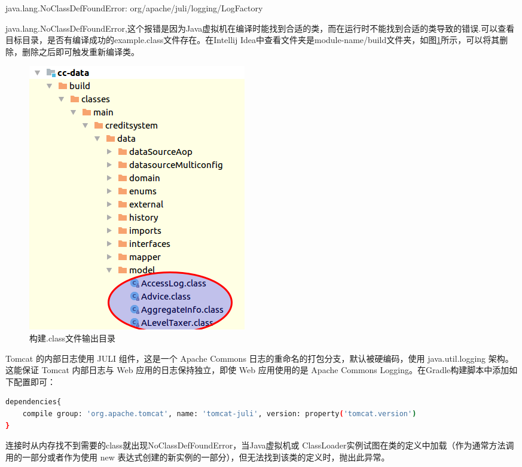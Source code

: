 \documentclass[12pt]{book}
\makeatletter
\numberwithin{dummy}{section}
\theoremstyle{ocrenumbox}
\theoremstyle{blacknumex}
\theoremstyle{blacknumbox}
\theoremstyle{ocrenum}
\renewcommand\paragraph{\@startsection{paragraph}{4}{\z@}
	{-2ex \@plus-.2ex \@minus .2ex}
	{.1ex}
	{\normalfont\small\sffamily\bfseries}}
\makeatother
\begin{document}
\paragraph{java.lang.NoClassDefFoundError: org/apache/juli/logging/LogFactory}

java.lang.NoClassDefFoundError,这个报错是因为Java虚拟机在编译时能找到合适的类，而在运行时不能找到合适的类导致的错误.可以查看目标目录，是否有编译成功的example.class文件存在。在Intellij Idea中查看文件夹是module-name/build文件夹，如图\ref{fig:buildclassoutpath}所示，可以将其删除，删除之后即可触发重新编译类。

\begin{figure}[htbp]
	\centering
	\includegraphics[scale=0.5]{buildclassoutpath.png}
	\caption{构建.class文件输出目录}
	\label{fig:buildclassoutpath}
\end{figure}


Tomcat 的内部日志使用 JULI 组件，这是一个 Apache Commons 日志的重命名的打包分支，默认被硬编码，使用 java.util.logging 架构。这能保证 Tomcat 内部日志与 Web 应用的日志保持独立，即使 Web 应用使用的是 Apache Commons Logging。在Gradle构建脚本中添加如下配置即可：

\begin{lstlisting}[language=Bash]
dependencies{
	compile group: 'org.apache.tomcat', name: 'tomcat-juli', version: property('tomcat.version')
}
\end{lstlisting}

连接时从内存找不到需要的class就出现NoClassDefFoundError，当Java虚拟机或 ClassLoader实例试图在类的定义中加载（作为通常方法调用的一部分或者作为使用 new 表达式创建的新实例的一部分），但无法找到该类的定义时，抛出此异常。 
\end{document}
